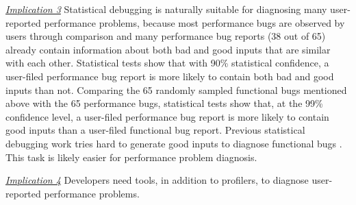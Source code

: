 \underline{\textit{Implication 3}}
Statistical debugging is naturally suitable for diagnosing many
user-reported performance problems,
because most performance bugs are observed by users through comparison and many
performance bug reports (38 out of 65) already contain information about 
both bad and good inputs that are similar with each other.
Statistical tests \cite{ztest} show that with 90\% statistical confidence, 
a user-filed performance bug report is more likely to contain both 
bad and good inputs than not.
Comparing the 65 randomly sampled functional bugs mentioned above with the 65
performance bugs, 
statistical tests \cite{ztest} show that, at the 99\% confidence level, 
a user-filed performance bug report is more likely to contain
good inputs than a user-filed
functional bug report.
Previous statistical debugging work tries hard to generate good
inputs to diagnose functional bugs \citep{delta}. This task is
likely easier for performance problem diagnosis.

\underline{\textit{Implication 4}}
Developers need tools, in addition to profilers, to diagnose
user-reported performance problems.
